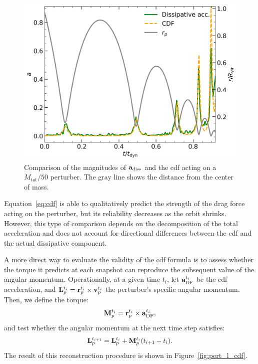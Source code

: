 \documentclass[twocolumn, a4paper]{article}
\begin{document}
\begin{figure}
    \centering
    \includegraphics[width=\columnwidth]{images/pert_acc_cdf.png}
    \caption{Comparison of the magnitudes of \(\vb{a}_\text{diss}\) and the \acrshort{cdf} acting on a \(M_\text{tot} / 50\) perturber. The gray line shows the distance from the center of mass.}
    \label{fig:pert_acc_cdf}
\end{figure}

Equation~\ref{eq:cdf} is able to qualitatively predict the strength of the drag force acting on the perturber, but its reliability decreases as the orbit shrinks. However, this type of comparison depends on the decomposition of the total acceleration and does not account for directional differences between the \acrshort{cdf} and the actual dissipative component.

A more direct way to evaluate the validity of the \acrshort{cdf} formula is to assess whether the torque it predicts at each snapshot can reproduce the subsequent value of the angular momentum. Operationally, at a given time \(t_i\), let \(\vb{a}_\text{DF}^{t_i}\) be the \acrshort{cdf} acceleration, and \(\vb{L}_p^{t_i} = \vb{r}_p^{t_i} \times \vb{v}_p^{t_i}\) the perturber’s specific angular momentum. Then, we define the torque:
\[
\vb{M}_p^{t_i} = \vb{r}_p^{t_i} \times \vb{a}_\text{DF}^{t_i},
\]
and test whether the angular momentum at the next time step satisfies:
\[
\vb{L}_p^{t_{i+1}} = \vb{L}_p^{t_i} + \vb{M}_p^{t_i} (t_{i+1} - t_i).
\]
The result of this reconstruction procedure is shown in Figure~\ref{fig:pert_l_cdf}.
\end{document}
